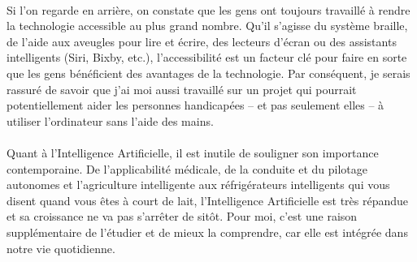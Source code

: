\paragraph{}
Si l'on regarde en arrière, on constate que les gens ont toujours travaillé à rendre la technologie accessible au plus grand nombre.
Qu'il s'agisse du système braille, de l'aide aux aveugles pour lire et écrire, des lecteurs d'écran ou des assistants intelligents (Siri, Bixby, etc.), l'accessibilité est un facteur clé pour faire en sorte que les gens bénéficient des avantages de la technologie.
Par conséquent, je serais rassuré de savoir que j'ai moi aussi travaillé sur un projet qui pourrait potentiellement aider les personnes handicapées – et pas seulement elles – à utiliser l'ordinateur sans l'aide des mains.
\paragraph{}
Quant à l'Intelligence Artificielle, il est inutile de souligner son importance contemporaine.
De l'applicabilité médicale, de la conduite et du pilotage autonomes et l'agriculture intelligente aux réfrigérateurs intelligents qui vous disent quand vous êtes à court de lait, l'Intelligence Artificielle est très répandue et sa croissance ne va pas s'arrêter de sitôt.
Pour moi, c'est une raison supplémentaire de l'étudier et de mieux la comprendre, car elle est intégrée dans notre vie quotidienne.

